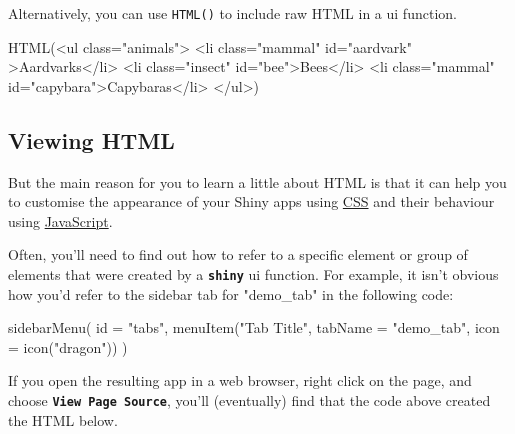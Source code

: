 \documentclass[
  oneside]{book}
\newenvironment{Shaded}{\begin{snugshade}}{\end{snugshade}}
\newcommand{\AttributeTok}[1]{\textcolor[rgb]{0.77,0.63,0.00}{#1}}
\newcommand{\FunctionTok}[1]{\textcolor[rgb]{0.00,0.00,0.00}{#1}}
\newcommand{\NormalTok}[1]{#1}
\newcommand{\StringTok}[1]{\textcolor[rgb]{0.31,0.60,0.02}{#1}}
\begin{document}
Alternatively, you can use \texttt{HTML}\texttt{()} to include raw HTML in a ui function.

\begin{Shaded}
\begin{Highlighting}[]
\FunctionTok{HTML}\NormalTok{(}\StringTok{\textquotesingle{}\textless{}ul class="animals"\textgreater{}}
\StringTok{    \textless{}li class="mammal" id="aardvark" \textgreater{}Aardvarks\textless{}/li\textgreater{}}
\StringTok{    \textless{}li class="insect" id="bee"\textgreater{}Bees\textless{}/li\textgreater{}}
\StringTok{    \textless{}li class="mammal" id="capybara"\textgreater{}Capybaras\textless{}/li\textgreater{}}
\StringTok{\textless{}/ul\textgreater{}\textquotesingle{}}\NormalTok{)}
\end{Highlighting}
\end{Shaded}

\hypertarget{viewing-html}{%
\subsection{Viewing HTML}\label{viewing-html}}

But the main reason for you to learn a little about HTML is that it can help you to customise the appearance of your Shiny apps using \protect\hyperlink{CSS}{CSS} and their behaviour using \protect\hyperlink{JavaScript}{JavaScript}.

Often, you'll need to find out how to refer to a specific element or group of elements that were created by a \textbf{\texttt{shiny}} ui function. For example, it isn't obvious how you'd refer to the sidebar tab for \StringTok{"demo\_tab"} in the following code:

\begin{Shaded}
\begin{Highlighting}[]
\FunctionTok{sidebarMenu}\NormalTok{(}
    \AttributeTok{id =} \StringTok{"tabs"}\NormalTok{,}
    \FunctionTok{menuItem}\NormalTok{(}\StringTok{"Tab Title"}\NormalTok{, }\AttributeTok{tabName =} \StringTok{"demo\_tab"}\NormalTok{, }\AttributeTok{icon =} \FunctionTok{icon}\NormalTok{(}\StringTok{"dragon"}\NormalTok{))}
\NormalTok{)}
\end{Highlighting}
\end{Shaded}

If you open the resulting app in a web browser, right click on the page, and choose \textbf{\texttt{View\ Page\ Source}}, you'll (eventually) find that the code above created the HTML below.
\end{document}
